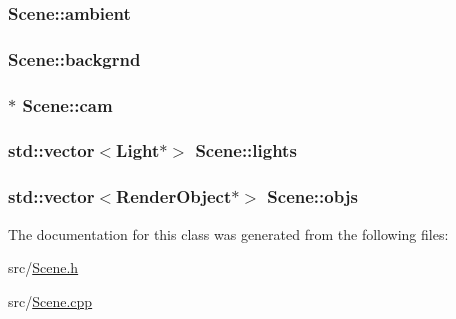 \subsubsection[{\texorpdfstring{ambient}{ambient}}]{ Scene\+::ambient\hspace{0.3cm}{\ttfamily [private]}}\hypertarget{classScene_a284ce5b2aeb47c64d6712d9748229c47}{}\label{classScene_a284ce5b2aeb47c64d6712d9748229c47}
\subsubsection[{\texorpdfstring{backgrnd}{backgrnd}}]{ Scene\+::backgrnd\hspace{0.3cm}{\ttfamily [private]}}\hypertarget{classScene_ac745fba97d639cebcf0e8fbf59967da2}{}\label{classScene_ac745fba97d639cebcf0e8fbf59967da2}
\subsubsection[{\texorpdfstring{cam}{cam}}]{$\ast$ Scene\+::cam\hspace{0.3cm}{\ttfamily [private]}}\hypertarget{classScene_a3e5448bc1b1150aa67049914b7800b63}{}\label{classScene_a3e5448bc1b1150aa67049914b7800b63}
\subsubsection[{\texorpdfstring{lights}{lights}}]{\setlength{\rightskip}{0pt plus 5cm}std\+::vector$<${\bf Light}$\ast$$>$ Scene\+::lights\hspace{0.3cm}{\ttfamily [private]}}\hypertarget{classScene_a4ecc3182a80435e1c4dfbe1b20e559bd}{}\label{classScene_a4ecc3182a80435e1c4dfbe1b20e559bd}
\subsubsection[{\texorpdfstring{objs}{objs}}]{\setlength{\rightskip}{0pt plus 5cm}std\+::vector$<${\bf Render\+Object}$\ast$$>$ Scene\+::objs\hspace{0.3cm}{\ttfamily [private]}}\hypertarget{classScene_a37361b6054643b62fcb8e6b7c828e5dd}{}\label{classScene_a37361b6054643b62fcb8e6b7c828e5dd}


The documentation for this class was generated from the following files\+:\begin{DoxyCompactItemize}
\item 
src/\hyperlink{Scene_8h}{Scene.\+h}\item 
src/\hyperlink{Scene_8cpp}{Scene.\+cpp}\end{DoxyCompactItemize}
